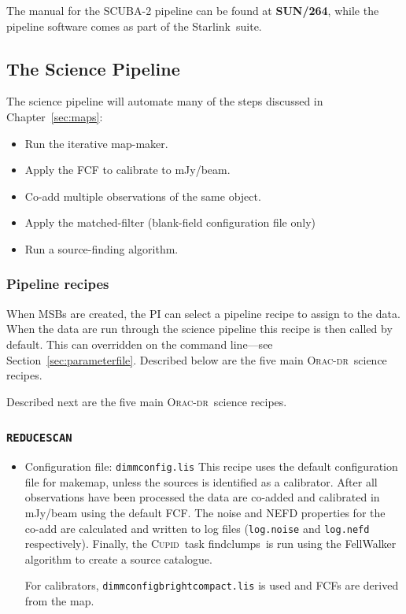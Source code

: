\documentclass[twoside,11pt]{article}
\newcommand{\htmladdnormallink}[2]{#1}
\newcommand{\htmlref}[2]{#1}
\newenvironment{latexonly}{}{}
\newcommand{\latexhtml}[2]{#1}
\newcommand{\xref}[3]{#1}
\newcommand{\xlabel}[1]{}
\renewcommand{\_}{\texttt{\symbol{95}}}
\newcommand{\starlink}{\htmladdnormallink{Starlink}{http://starlink.jach.hawaii.edu}}
\newcommand{\cupid}{\xref{\textsc{Cupid}}{sun255}{}}
\newcommand{\oracdr}{\htmladdnormallink{\textsc{Orac-dr}}{http://www.oracdr.org/oracdr}}
\newcommand{\drrecipe}[1]{\texttt{#1}}
\newcommand{\task}[1]{\textsf{#1}}
\newcommand{\file}[1]{\texttt{#1}}
\newcommand{\makemap}{\xref{\task{makemap}}{sun258}{MAKEMAP}}
\newcommand{\findclumps}{\xref{\task{findclumps}}{sun255}{FINDCLUMPS}}
\newcommand{\pipelinesun}{\xref{\textbf{SUN/264}}{sun264}{}}
\newcommand{\cref}[3]{\latexhtml{#1~\ref{#2}}{\htmlref{#3}{#2}}}
\begin{document}
The manual for the SCUBA-2 pipeline can be found at \pipelinesun,
while the pipeline software comes as part of the \starlink\ suite.


\subsection{\xlabel{science_pl}The Science Pipeline}

The science pipeline will automate many of the steps discussed in
\cref{Chapter}{sec:maps}{Reducing Your Data}:
\vspace{-0.3cm}
\begin{itemize}\itemsep-0.3em
\item Run the iterative map-maker.
\item Apply the FCF to calibrate to mJy/beam.
\item Co-add multiple observations of the same object.
\item Apply the matched-filter (blank-field configuration file only)
\item Run a source-finding algorithm.
\end{itemize}

\subsubsection{\xlabel{pl_output}Pipeline recipes}
\label{sec:recipes}

When MSBs are created, the PI can select a pipeline recipe to assign
to the data. When the data are run through the science pipeline this
recipe is then called by default. This can overridden on the command
line---see \cref{Section}{sec:parameterfile}{Changing the defaults}.
\begin{latexonly}
Described below are the five main \oracdr\ science recipes.
\end{latexonly}
\begin{htmlonly}
Described next are the five main \oracdr\ science recipes.
\end{htmlonly}

\subsubsection{\xlabel{extsources}\drrecipe{REDUCE\_SCAN}}
\begin{itemize}
\item  Configuration file: \file{dimmconfig.lis}
\newline\newline
This recipe uses the default configuration file for \makemap, unless
the sources is identified as a calibrator. After all observations have
been processed the data are co-added and calibrated in mJy/beam using the
default FCF. The noise and NEFD properties for the co-add are calculated
and written to log files (\file{log.noise} and \file{log.nefd}
respectively). Finally, the \cupid\ task \findclumps\ is run using the
FellWalker algorithm to create a source catalogue.

For calibrators, \file{dimmconfig\_bright\_compact.lis} is used and
FCFs are derived from the map.
\end{itemize}
\end{document}
